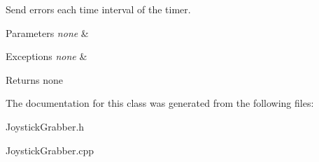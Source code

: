 Send errors each time interval of the timer. 


\begin{DoxyParams}{Parameters}
{\em none} & \\
\hline
\end{DoxyParams}

\begin{DoxyExceptions}{Exceptions}
{\em none} & \\
\hline
\end{DoxyExceptions}
\begin{DoxyReturn}{Returns}
none 
\end{DoxyReturn}


The documentation for this class was generated from the following files\-:\begin{DoxyCompactItemize}
\item 
Joystick\-Grabber.\-h\item 
Joystick\-Grabber.\-cpp\end{DoxyCompactItemize}
